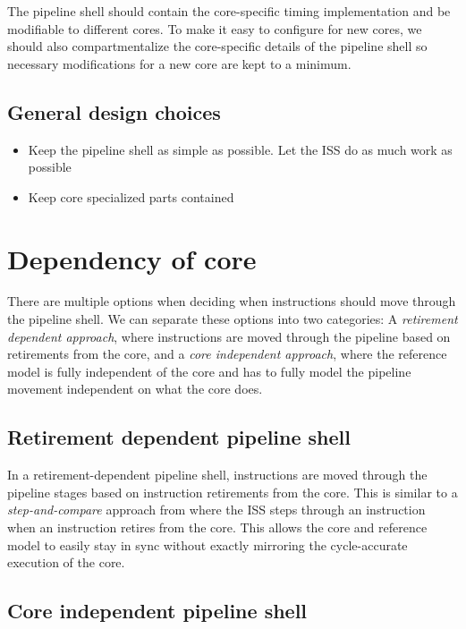 The pipeline shell should contain the core-specific timing implementation and be modifiable to different cores. To make it easy to configure for new cores, we should also compartmentalize the core-specific details of the pipeline shell so necessary modifications for a new core are kept to a minimum.


\subsection{General design choices}

\begin{itemize}
    \item Keep the pipeline shell as simple as possible. Let the ISS do as much work as possible
    \item Keep core specialized parts contained
\end{itemize}


\section{Dependency of core}
\label{sec:ps_dependency}

There are multiple options when deciding when instructions should move through the pipeline shell. We can separate these options into two categories: A \textit{retirement dependent approach}, where instructions are moved through the pipeline based on retirements from the core, and a \textit{core independent approach}, where the reference model is fully independent of the core and has to fully model the pipeline movement independent on what the core does. 

\subsection{Retirement dependent pipeline shell}

In a retirement-dependent pipeline shell, instructions are moved through the pipeline stages based on instruction retirements from the core. This is similar to a \textit{step-and-compare} approach from  where the ISS steps through an instruction when an instruction retires from the core. This allows the core and reference model to easily stay in sync without exactly mirroring the cycle-accurate execution of the core.


\subsection{Core independent pipeline shell}

